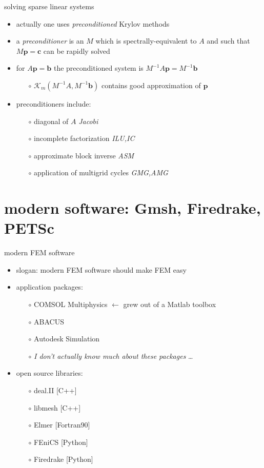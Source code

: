 \documentclass[hide notes,intlimits,usenames,dvipsnames]{beamer}
\newcommand{\bb}{\mathbf{b}}
\newcommand{\bc}{\mathbf{c}}
\newcommand{\bp}{\mathbf{p}}
\begin{document}
\begin{frame}{solving sparse linear systems}
\begin{itemize}
\item actually one uses \emph{preconditioned} Krylov methods
\item a \emph{preconditioner} is an $M$ which is spectrally-equivalent to $A$ and such that $M\bp=\bc$ can be rapidly solved
\item for $A\bp=\bb$ the preconditioned system is $M^{-1} A \bp = M^{-1} \bb$
    \begin{itemize}
    \item[$\circ$] $\mathcal{K}_m(M^{-1} A,M^{-1} \bb)$ contains good approximation of $\bp$
    \end{itemize}
\item preconditioners include:
    \begin{itemize}
    \item[$\circ$] diagonal of $A$ \hfill \emph{Jacobi}
    \item[$\circ$] incomplete factorization \hfill \emph{ILU,IC}
    \item[$\circ$] approximate block inverse \hfill \emph{ASM}
    \item[$\circ$] application of multigrid cycles \hfill \emph{GMG,AMG}
    \end{itemize}
\end{itemize}
\end{frame}


\section{modern software: Gmsh, Firedrake, PETSc}

\begin{frame}{modern FEM software}

\begin{itemize}
\item slogan: \alert{modern FEM software should make FEM easy}
\item application packages:
    \begin{itemize}
    \item[$\circ$] COMSOL Multiphysics  \hfill $\leftarrow$ grew out of a Matlab toolbox
    \item[$\circ$] ABACUS
    \item[$\circ$] Autodesk Simulation
    \item[$\circ$] \emph{I don't actually know much about these packages} \dots
    \end{itemize}
\item open source libraries:
    \begin{itemize}
    \item[$\circ$] deal.II [C++]
    \item[$\circ$] libmesh [C++]
    \item[$\circ$] Elmer [Fortran90]
    \item[$\circ$] FEniCS [Python]
    \item[$\circ$] Firedrake [Python]
    \end{itemize}

\end{itemize}
\end{frame}
\end{document}
